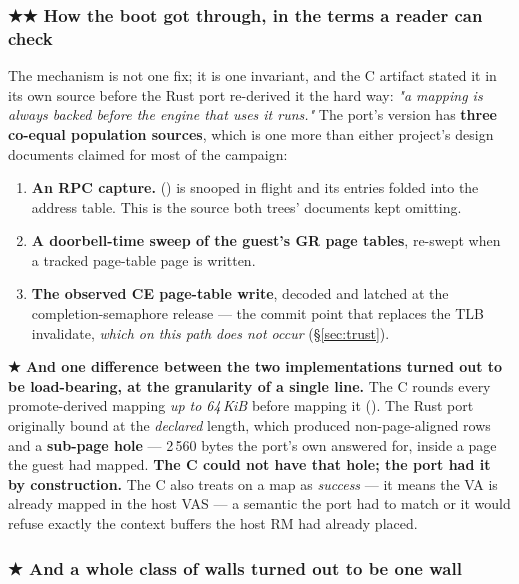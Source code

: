 \documentclass[10.5pt]{article}
\begin{document}
\subsubsection*{★★ How the boot got through, in the terms a reader can check}

The mechanism is not one fix; it is one invariant, and the C artifact stated it in its own source
before the Rust port re-derived it the hard way: \emph{"a mapping is always backed before the
engine that uses it runs."} The port's version has \textbf{three co-equal population sources},
which is one more than either project's design documents claimed for most of the campaign:

\begin{enumerate}[itemsep=0.3ex]
\item \textbf{An RPC capture.}  () is
  snooped in flight and its  entries folded into
  the address table. This is the source both trees' documents kept omitting.
\item \textbf{A doorbell-time sweep of the guest's GR page tables}, re-swept when a tracked
  page-table page is written.
\item \textbf{The observed CE page-table write}, decoded and latched at the completion-semaphore
  release — the commit point that replaces the TLB invalidate, \emph{which on this path does not
  occur} (\S\ref{sec:trust}).
\end{enumerate}

\textbf{★ And one difference between the two implementations turned out to be load-bearing, at the
granularity of a single line.} The C rounds every promote-derived mapping \emph{up to 64\,KiB}
before mapping it (). The Rust port originally bound at
the \emph{declared} length, which produced non-page-aligned rows and a \textbf{sub-page hole} —
2\,560 bytes the port's own  answered  for, inside a page the guest had
mapped. \textbf{The C could not have that hole; the port had it by construction.} The C also
treats  on a  map as \emph{success} — it means the VA is
already mapped in the host VAS — a semantic the port had to match or it would refuse exactly the
context buffers the host RM had already placed.

\subsubsection*{★ And a whole class of walls turned out to be one wall}
\end{document}
